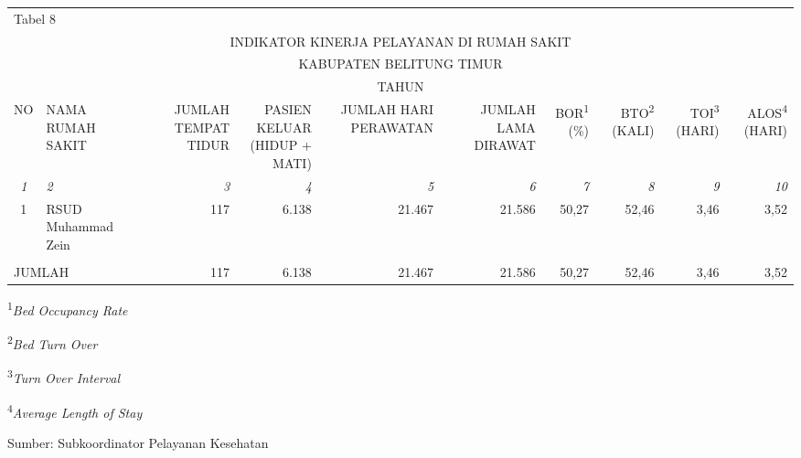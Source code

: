 {}

{\centering %
\begin{tabular}{clrrrrrrrr}
	\multicolumn{10}{l}{Tabel 8}\\
	\multicolumn{10}{c}{INDIKATOR KINERJA PELAYANAN DI RUMAH SAKIT}\\
	\multicolumn{10}{c}{KABUPATEN BELITUNG TIMUR}\\
	\multicolumn{10}{c}{TAHUN \tP}\\
	\toprule
	\multicolumn{1}{c}{NO} & \multicolumn{1}{l}{NAMA RUMAH SAKIT} & \multicolumn{1}{r}{\parbox{2.5cm}{\raggedleft JUMLAH TEMPAT TIDUR}} & \multicolumn{1}{r}{\parbox{2.5cm}{\raggedleft PASIEN KELUAR \\(HIDUP + MATI)}} & \multicolumn{1}{r}{\parbox{3cm}{\raggedleft JUMLAH HARI PERAWATAN}} & \multicolumn{1}{r}{\parbox{3cm}{\raggedleft JUMLAH LAMA DIRAWAT}} & \multicolumn{1}{r}{BOR\textsuperscript{1} (\%)} & \multicolumn{1}{r}{BTO\textsuperscript{2} (KALI)} & \multicolumn{1}{r}{TOI\textsuperscript{3} (HARI)} & \multicolumn{1}{r}{ALOS\textsuperscript{4} (HARI)} \\
	\midrule
	\emph{1} & \emph{2} & \emph{3} & \emph{4} & \emph{5} & \emph{6} & \emph{7} & \emph{8} & \emph{9} & \emph{10}\\
	\midrule
	1 & RSUD Muhammad Zein     & 117 & 6.138 & 21.467 & 21.586 & 50,27 & 52,46 & 3,46 & 3,52 \\
	& & & & & & & & &  \\
	\midrule
	\multicolumn{2}{l}{JUMLAH} & 117 & 6.138 & 21.467 & 21.586 & 50,27 & 52,46 & 3,46 & 3,52 \\
	\bottomrule
\end{tabular}%

}

\vspace{2ex}
{\small
\textsuperscript{1}\emph{Bed Occupancy Rate}

\textsuperscript{2}\emph{Bed Turn Over}

\textsuperscript{3}\emph{Turn Over Interval}

\textsuperscript{4}\emph{Average Length of Stay}

}

\vfill
Sumber: Subkoordinator Pelayanan Kesehatan\par
